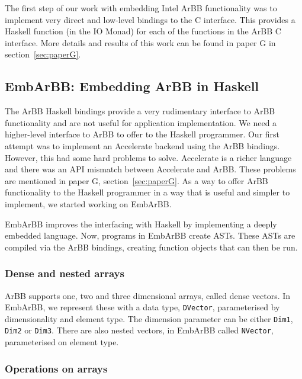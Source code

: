 \documentclass[a4paper]{book}
\begin{document}
The first step of our work with embedding Intel ArBB functionality was to implement very direct 
and low-level bindings to the C interface. This provides a Haskell function (in the IO Monad) 
for each of the functions in the ArBB C interface. More details and results of this work 
can be found in paper G in section~\ref{sec:paperG}.



\subsection{EmbArBB: Embedding ArBB in Haskell}
\label{sec:EmbArBB} 

The ArBB Haskell bindings provide a very rudimentary interface to ArBB functionality and 
are not useful for application implementation. We need a higher-level interface to ArBB to offer 
to the Haskell programmer. Our first attempt was to implement an Accelerate backend 
using the ArBB bindings. However, this had some hard problems to solve. Accelerate is a 
richer language and there was an API mismatch between Accelerate and ArBB. These problems 
are mentioned in paper G, section~\ref{sec:paperG}. As a way to offer ArBB functionality 
to the Haskell programmer in a way that is useful and simpler to implement, we started 
working on EmbArBB. 

EmbArBB improves the interfacing with Haskell by implementing a deeply embedded language. 
Now, programs in EmbArBB create ASTs. These ASTs are compiled via the ArBB bindings, creating 
function objects that can then be run. 

\subsubsection{Dense and nested arrays}

ArBB supports one, two and three dimensional arrays, called dense vectors. In \\ EmbArBB, we 
represent these with a data type, {\tt DVector}, parameterised by dimensionality and 
element type. The dimension parameter can be either {\tt Dim1}, {\tt Dim2} or {\tt Dim3}. 
There are also nested vectors, in EmbArBB called {\tt NVector}, parameterised on element type. 

\subsubsection{Operations on arrays} 
\end{document}

